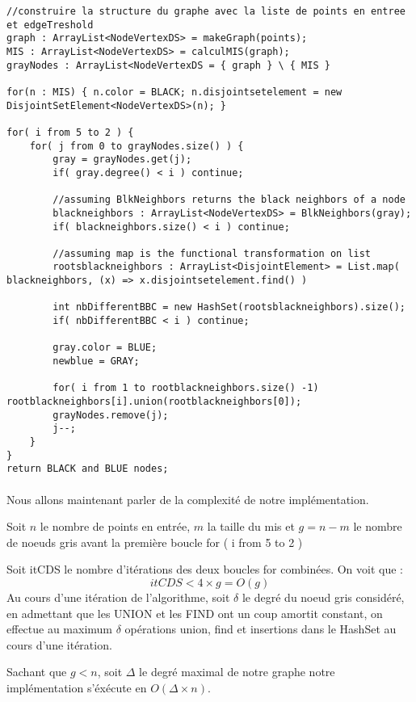 \begin{lstlisting}
//construire la structure du graphe avec la liste de points en entree et edgeTreshold
graph : ArrayList<NodeVertexDS> = makeGraph(points);
MIS : ArrayList<NodeVertexDS> = calculMIS(graph);
grayNodes : ArrayList<NodeVertexDS = { graph } \ { MIS }

for(n : MIS) { n.color = BLACK; n.disjointsetelement = new DisjointSetElement<NodeVertexDS>(n); }

for( i from 5 to 2 ) {
    for( j from 0 to grayNodes.size() ) {
      	gray = grayNodes.get(j);
      	if( gray.degree() < i ) continue;
      
      	//assuming BlkNeighbors returns the black neighbors of a node
      	blackneighbors : ArrayList<NodeVertexDS> = BlkNeighbors(gray);
      	if( blackneighbors.size() < i ) continue;
      
      	//assuming map is the functional transformation on list
      	rootsblackneighbors : ArrayList<DisjointElement> = List.map( blackneighbors, (x) => x.disjointsetelement.find() )
      
      	int nbDifferentBBC = new HashSet(rootsblackneighbors).size();
      	if( nbDifferentBBC < i ) continue;
      
      	gray.color = BLUE;
      	newblue = GRAY;
      
      	for( i from 1 to rootblackneighbors.size() -1) rootblackneighbors[i].union(rootblackneighbors[0]);
      	grayNodes.remove(j);
      	j--;
	}
}
return BLACK and BLUE nodes;
\end{lstlisting}

\paragraph{}
Nous allons maintenant parler de la complexité de notre implémentation.

Soit $n$ le nombre de points en entrée, $m$ la taille du mis et $g = n-m$ le nombre de noeuds gris avant la première boucle for ( i from 5 to 2 )

Soit itCDS le nombre d'itérations des deux boucles for combinées. On voit que :
$$
itCDS < 4 \times g = O(g)
$$
Au cours d'une itération de l'algorithme, soit $\delta$ le degré du noeud gris considéré, en admettant que les UNION et les FIND ont un coup amortit constant, on effectue au maximum $\delta$ opérations union, find et insertions dans le HashSet au cours d'une itération.

Sachant que $g < n$, soit $\Delta$ le degré maximal de notre graphe notre implémentation s'éxécute en $O(\Delta \times n)$.